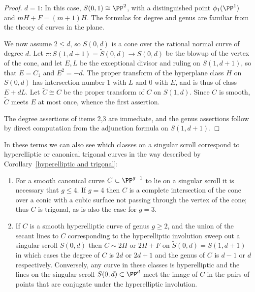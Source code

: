 \begin{proof}
\noindent $d=1$: In this case, $S(0,1)\cong \PP^{2}$, with a distinguished
point $\phi_{1}(\PP^{1})$ and $mH+F = (m+1)H$.
The formulas for degree and genus are familiar from the theory of curves
in the plane.

We now assume $2\leq d$, so $S(0,d)$ is a cone over the rational normal
curve of degree $d$. Let $\pi: S(1,d+1) = \tilde S(0,d) \to S(0,d)$
be the blowup of the vertex of the cone, and let $E,L$ be the exceptional
divisor and ruling on $S(1, d+1)$,
so that $E = C_{1}$ and $E^{2} = -d$. The proper transform of the
hyperplane class $H$ on $S(0,d)$ has intersection number 1 with $L$
and $0$ with $E$,
and is thus of class $E+dL$. Let $\tilde C \cong C$ be the proper
transform of $C$ on $S(1,d)$.
Since $C$ is smooth, $\tilde C$ meets $E$ at most once, whence the
first assertion.

The degree assertions of items 2,3 are immediate, and the genus assertions
follow by direct computation from the
adjunction formula on $S(1,d+1)$.
\end{proof}

In these terms we can also see which classes on a singular scroll
correspond to 
hyperelliptic
%
 or canonical 
trigonal
%
 curves in the way
described by Corollary~\ref{hyperelliptic and trigonal}:

\begin{corollary}\label{which class}
\begin{enumerate}
\item For a smooth canonical curve $C\subset \PP^{g-1}$ to lie on a
singular scroll it is necessary that $g\leq 4$.
If $g=4$ then $C$ is a complete intersection of the cone over a conic
with a cubic surface not passing through
the vertex of the cone; thus $C$ is trigonal, as is also the case
for $g=3$.

\item If  $C$ is a smooth hyperelliptic curve of genus $g\geq 2$, and
the union of the secant lines to $C$ corresponding to the
hyperelliptic involution sweep out 
a singular scroll $S(0,d)$ then
$C\sim 2H$ or $2H+F$ on $\tilde S(0,d) = S(1,d+1)$ in which cases
the degree of $C$ is $2d$ or $2d+1$ and the genus of $C$ is $d-1$ or $d$
respectively. Conversely,
any  curve in these classes is hyperelliptic and the lines on the singular
scroll	$S(0,d)\subset \PP^{d}$
meet the image of $C$ in the pairs of points that are conjugate under
the hyperelliptic involution.
\unif
\end{enumerate}
\end{corollary}

